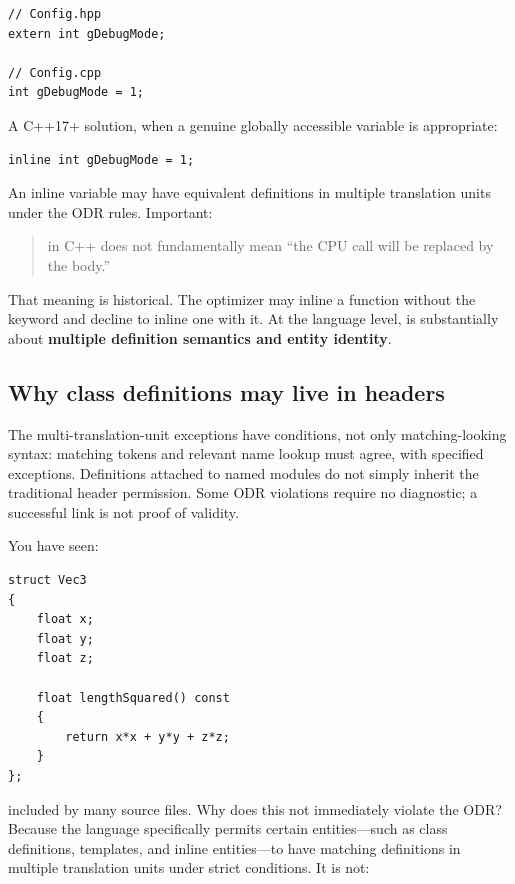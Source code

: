 \begin{verbatim}
// Config.hpp
extern int gDebugMode;

// Config.cpp
int gDebugMode = 1;
\end{verbatim}

A C++17+ solution, when a genuine globally accessible variable is appropriate:

\begin{verbatim}
inline int gDebugMode = 1;
\end{verbatim}

An inline variable may have equivalent definitions in multiple translation units under the ODR rules. Important:

\begin{quote}
 in C++ does not fundamentally mean ``the CPU call will be replaced by the body.''
\end{quote}

That meaning is historical. The optimizer may inline a function without the  keyword and decline to inline one with it. At the language level,  is substantially about \textbf{multiple definition semantics and entity identity}.

\subsection{Why class definitions may live in headers}\label{05-engine-i-ch002-why-class-definitions-may-live-in-headers}

\hypertarget{05-engine-i-ch002-why-class-definitions-may-live-in-headers}{}

The multi-translation-unit exceptions have conditions, not only matching-looking syntax: matching tokens and relevant name lookup must agree, with specified exceptions. Definitions attached to named modules do not simply inherit the traditional header permission. Some ODR violations require no diagnostic; a successful link is not proof of validity.

You have seen:

\begin{verbatim}
struct Vec3
{
    float x;
    float y;
    float z;

    float lengthSquared() const
    {
        return x*x + y*y + z*z;
    }
};
\end{verbatim}

included by many source files. Why does this not immediately violate the ODR? Because the language specifically permits certain entities---such as class definitions, templates, and inline entities---to have matching definitions in multiple translation units under strict conditions. It is not:

